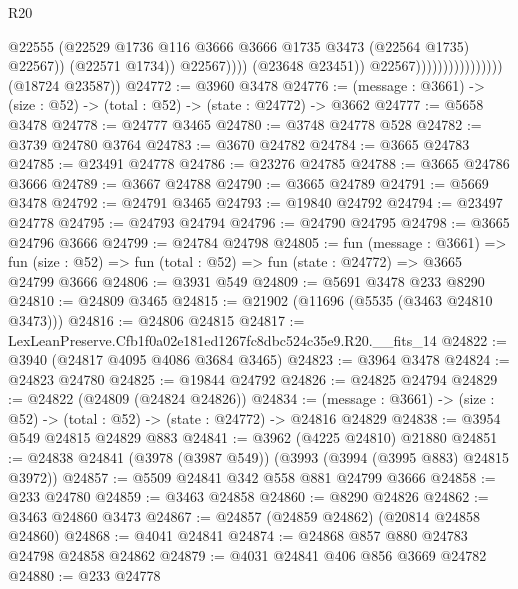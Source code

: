 \begin{lexlean}{R20}
\begin{coremodule}
                                                    @22555
                                                    (@22529
                                                      @1736
                                                      @116
                                                      @3666
                                                      @3666
                                                      @1735
                                                      @3473
                                                      (@22564 @1735)
                                                      @22567))
                                                  (@22571 @1734))
                                                @22567))))
                                        (@23648 @23451))
                                      @22567))))))))))))))))
      (@18724 @23587))
@24772 := @3960 @3478
@24776 := (message : @3661) -> (size : @52) -> (total : @52) -> (state : @24772) -> @3662
@24777 := @5658 @3478
@24778 := @24777 @3465
@24780 := @3748 @24778 @528
@24782 := @3739 @24780 @3764
@24783 := @3670 @24782
@24784 := @3665 @24783
@24785 := @23491 @24778
@24786 := @23276 @24785
@24788 := @3665 @24786 @3666
@24789 := @3667 @24788
@24790 := @3665 @24789
@24791 := @5669 @3478
@24792 := @24791 @3465
@24793 := @19840 @24792
@24794 := @23497 @24778
@24795 := @24793 @24794
@24796 := @24790 @24795
@24798 := @3665 @24796 @3666
@24799 := @24784 @24798
@24805 := fun (message : @3661) =>
  fun (size : @52) => fun (total : @52) => fun (state : @24772) => @3665 @24799 @3666
@24806 := @3931 @549
@24809 := @5691 @3478 @233 @8290
@24810 := @24809 @3465
@24815 := @21902 (@11696 (@5535 (@3463 @24810 @3473)))
@24816 := @24806 @24815
@24817 := LexLeanPreserve.Cfb1f0a02e181ed1267fc8dbc524c35e9.R20.__fits_14
@24822 := @3940 (@24817 @4095 @4086 @3684 @3465)
@24823 := @3964 @3478
@24824 := @24823 @24780
@24825 := @19844 @24792
@24826 := @24825 @24794
@24829 := @24822 (@24809 (@24824 @24826))
@24834 := (message : @3661) -> (size : @52) -> (total : @52) -> (state : @24772) -> @24816 @24829
@24838 := @3954 @549 @24815 @24829 @883
@24841 := @3962 (@4225 @24810) @21880
@24851 := @24838 @24841 (@3978 (@3987 @549)) (@3993 (@3994 (@3995 @883) @24815 @3972))
@24857 := @5509 @24841 @342 @558 @881 @24799 @3666
@24858 := @233 @24780
@24859 := @3463 @24858
@24860 := @8290 @24826
@24862 := @3463 @24860 @3473
@24867 := @24857 (@24859 @24862) (@20814 @24858 @24860)
@24868 := @4041 @24841
@24874 := @24868 @857 @880 @24783 @24798 @24858 @24862
@24879 := @4031 @24841 @406 @856 @3669 @24782
@24880 := @233 @24778

\end{coremodule}
\end{lexlean}

